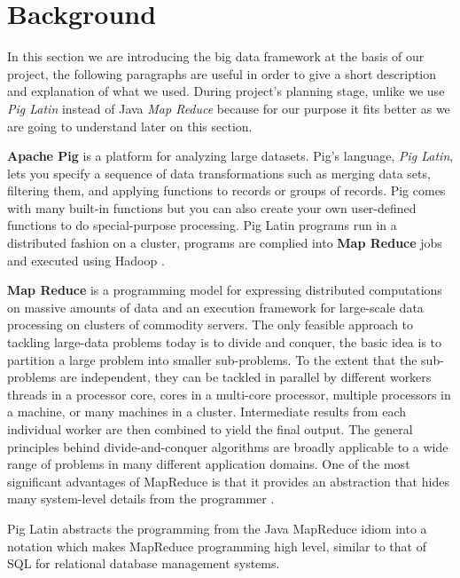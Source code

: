 \section{Background}
\label{sec:backg}
In this section we are introducing the big data framework at the basis of our project, the following paragraphs are useful in order to give a short description and explanation of what we used.  
During project's planning stage, unlike \cite{ddos_forensics} we use \textit{Pig Latin} instead of Java \textit{Map Reduce} because for our purpose it fits better as we are going to understand later on this section. 

\textbf{Apache Pig} is a platform for analyzing large datasets. Pig's language, \textit{Pig Latin}, lets you specify a sequence of data transformations such as merging data sets, filtering them, and applying functions to records or groups of records. Pig comes with many built-in functions but you can also create your own user-defined functions to do special-purpose processing.
Pig Latin programs run in a distributed fashion on a cluster, programs are complied into \textbf{Map Reduce} jobs and executed using Hadoop \cite{pig_wiki}.

\textbf{Map Reduce} is a programming model for expressing distributed computations on massive amounts of data and an execution framework for large-scale data processing on clusters of commodity servers. The only feasible approach to tackling large-data problems today is to divide and conquer, the basic idea is to partition a large problem into smaller sub-problems. To the extent that the sub-problems are independent, they can be tackled in parallel by different workers  threads in a processor core, cores in a multi-core processor, multiple processors in a machine, or many machines in a cluster. Intermediate results from each individual worker are then combined to yield the final output.
The general principles behind divide-and-conquer algorithms are broadly applicable to a wide range of problems in many different application domains. One of the most significant advantages of MapReduce is that it provides an abstraction that hides many system-level details from the programmer \cite{jimmy_lin}.

Pig Latin abstracts the programming from the Java MapReduce idiom into a notation which makes MapReduce programming high level, similar to that of SQL for relational database management systems.